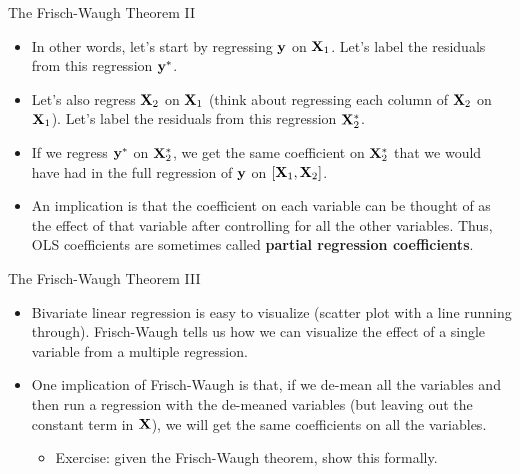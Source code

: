 \documentclass[aspectratio=169,11pt]{beamer}
\begin{document}
\begin{frame}{The Frisch-Waugh Theorem II}
\begin{itemize}
	\item In other words, let's start by regressing ${\bf y} $ on ${\bf X}_{1}$.
	Let's label the residuals from this regression ${\bf y}^{*} $.

	\item Let's also regress ${\bf X}_{2}$ on ${\bf X}_{1}$ 
	(think about regressing each column of ${\bf X}_{2}$ on ${\bf X}_{1}$).
	Let's label the residuals from this regression ${\bf X}^{*}_{2}$.

	\item If we regress ${\bf y}^{*}$ on ${\bf X}^{*}_{2}$, we get the same
	coefficient on ${\bf X}^{*}_{2}$ that we would have had in the full
	regression of  ${\bf y} $ on $\left[{\bf X}_{1},  {\bf X}_2 \right]$.

	\item An implication is that
	the coefficient on each variable can be thought of as the effect
	of that variable after controlling for all the other variables. Thus,
	OLS coefficients are sometimes called {\bf partial regression coefficients}.

\end{itemize}
\end{frame}



\begin{frame}{The Frisch-Waugh Theorem III}
\begin{itemize}
	\item Bivariate linear regression is easy to visualize (scatter plot with a line running through).
	Frisch-Waugh tells us how we can visualize the effect of a single variable from a multiple
	regression.

	\medskip
	\item One implication of Frisch-Waugh is that, if we de-mean all the variables and then 
	run a regression with the de-meaned variables (but leaving out the constant term in ${\bf X}$),
	we will get the same coefficients on all the variables.
	\begin{itemize}
		\item Exercise: given the Frisch-Waugh theorem, show this formally. 
	\end{itemize}
\end{itemize}
\end{frame}
\end{document}
